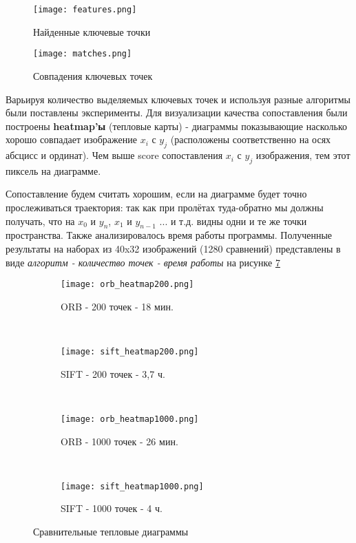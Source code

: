 \begin{figure}[h]
    \centering
    \texttt{[image: features.png]}
    \caption{Найденные ключевые точки}
    \label{fig:features}
\end{figure}

\begin{figure}[h]
    \centering
    \texttt{[image: matches.png]}
    \caption{Совпадения ключевых точек}
    \label{fig:matches}
\end{figure}

Варьируя количество выделяемых ключевых точек и используя разные алгоритмы были поставлены эксперименты. Для визуализации качества сопоставления были построены \textbf{heatmap'ы} (тепловые карты) - диаграммы показывающие насколько хорошо совпадает изображение $x_i$ с $y_j$ (расположены соответственно на осях абсцисс и ординат). Чем выше score сопоставления $x_i$ с $y_j$ изображения, тем  этот пиксель на диаграмме.

Сопоставление будем считать хорошим, если на диаграмме будет точно прослеживаться траектория: так как при пролётах туда-обратно мы должны получать, что на $x_0$ и $y_n$, $x_1$ и $y_{n-1}$ ... и т.д. видны одни и те же точки пространства. Также анализировалось время работы программы. Полученные результаты на наборах из 40x32 изображений (1280 сравнений) представлены в виде \textit{алгоритм - количество точек - время работы} на рисунке \ref{fig:heatmaps}

\begin{figure}[h]
    \centering
    \begin{subfigure}[h]{0.45\textwidth}
        \texttt{[image: orb\_heatmap200.png]}
        \caption{ORB - 200 точек - 18 мин.}
        \label{fig:orb_200}
    \end{subfigure}
    ~ 
    \begin{subfigure}[h]{0.45\textwidth}
        \texttt{[image: sift\_heatmap200.png]}
        \caption{SIFT - 200 точек - 3,7 ч.}
        \label{fig:sift_200}
    \end{subfigure}
    ~ 
    \begin{subfigure}[h]{0.45\textwidth}
        \texttt{[image: orb\_heatmap1000.png]}
        \caption{ORB - 1000 точек - 26 мин.}
        \label{fig:mouse}
    \end{subfigure}
    ~
    \begin{subfigure}[h]{0.45\textwidth}
        \texttt{[image: sift\_heatmap1000.png]}
        \caption{SIFT - 1000 точек - 4 ч.}
        \label{fig:mouse}
    \end{subfigure}
    \caption{Сравнительные тепловые диаграммы}
    \label{fig:heatmaps}
\end{figure}

